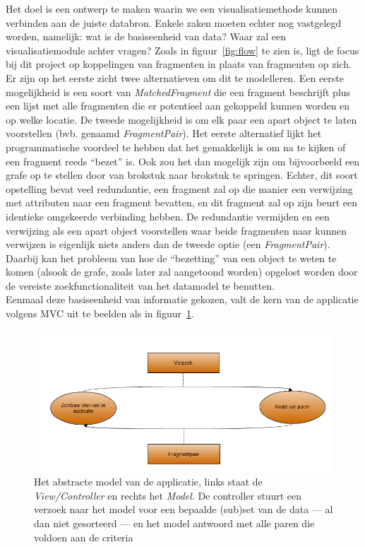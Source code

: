 Het doel is een ontwerp te maken waarin we een visualisatiemethode kunnen verbinden aan de juiste databron. Enkele zaken moeten echter nog vastgelegd worden, namelijk: wat is de basiseenheid van data? Waar zal een visualisatiemodule achter vragen? Zoals in figuur~\ref{fig:flow} te zien is, ligt de focus bij dit project op koppelingen van fragmenten in plaats van fragmenten op zich. Er zijn op het eerste zicht twee alternatieven om dit te modelleren. Een eerste mogelijkheid is een soort van \emph{MatchedFragment} die een fragment beschrijft plus een lijst met alle fragmenten die er potentieel aan gekoppeld kunnen worden en op welke locatie. De tweede mogelijkheid is om elk paar een apart object te laten voorstellen (bvb. genaamd \emph{FragmentPair}). Het eerste alternatief lijkt het programmatische voordeel te hebben dat het gemakkelijk is om na te kijken of een fragment reeds ``bezet'' is. Ook zou het dan mogelijk zijn om bijvoorbeeld een grafe op te stellen door van brokstuk naar brokstuk te springen. Echter, dit soort opstelling bevat veel redundantie, een fragment zal op die manier een verwijzing met attributen naar een fragment bevatten, en dit fragment zal op zijn beurt een identieke omgekeerde verbinding hebben. De redundantie vermijden en een verwijzing als een apart object voorstellen waar beide fragmenten naar kunnen verwijzen is eigenlijk niets anders dan de tweede optie (een \emph{FragmentPair}). Daarbij kan het probleem van hoe de ``bezetting'' van een object te weten te komen (alsook de grafe, zoals later zal aangetoond worden) opgelost worden door de vereiste zoekfunctionaliteit van het datamodel te benutten.\\

Eenmaal deze basiseenheid van informatie gekozen, valt de kern van de applicatie volgens MVC uit te beelden als in figuur~\ref{fig:basicprogramflow}.

\begin{figure}[ht]
	\begin{center}
		\includegraphics[width=1.0\columnwidth]{images/BasicExecutionFlow.png}
		\caption{Het abstracte model van de applicatie, links staat de \emph{View/Controller} en rechts het \emph{Model}. De controller stuurt een verzoek naar het model voor een bepaalde (sub)set van de data --- al dan niet gesorteerd --- en het model antwoord met alle paren die voldoen aan de criteria}
		\label{fig:basicprogramflow}
	\end{center}
\end{figure}

